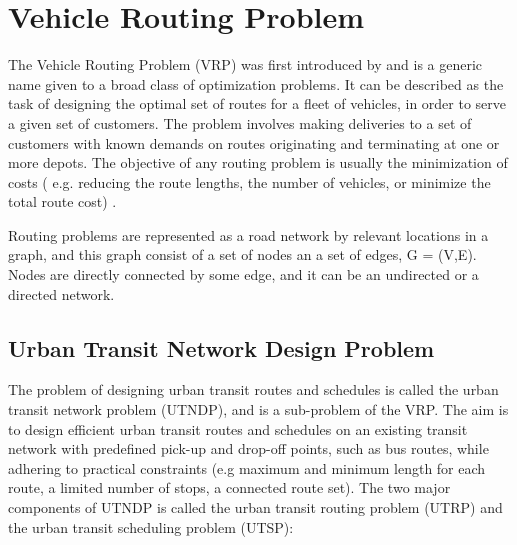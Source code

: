 \section{Vehicle Routing Problem }

The Vehicle Routing Problem (VRP) was first introduced by \citet{dantzig59} and is a generic name given to a broad class of optimization problems. It can be described as the task of designing the optimal set of routes for a fleet of vehicles, in order to serve a given set of customers. The problem involves making deliveries to a set of customers with known demands on routes originating and terminating at one or more depots. The objective of any routing problem is usually the minimization of costs ( e.g. reducing the route lengths, the number of vehicles, or minimize the total route cost) . 

Routing problems are represented as a road network by relevant locations in a graph, and this graph consist of a set of nodes an a set of edges, G = (V,E). Nodes are directly connected by some edge, and it can be an undirected or a directed network. 

\subsection{Urban Transit Network Design Problem}

The problem of designing urban transit routes and schedules is called the urban transit network problem (UTNDP), and is a sub-problem of the VRP. The aim is to design efficient urban transit routes and schedules on an existing transit network with predefined pick-up and drop-off points, such as bus routes, while adhering to practical constraints (e.g maximum and minimum length for each route, a limited number of stops, a connected route set). The two major components of UTNDP is called the urban transit routing problem (UTRP) and the urban transit scheduling problem (UTSP):

